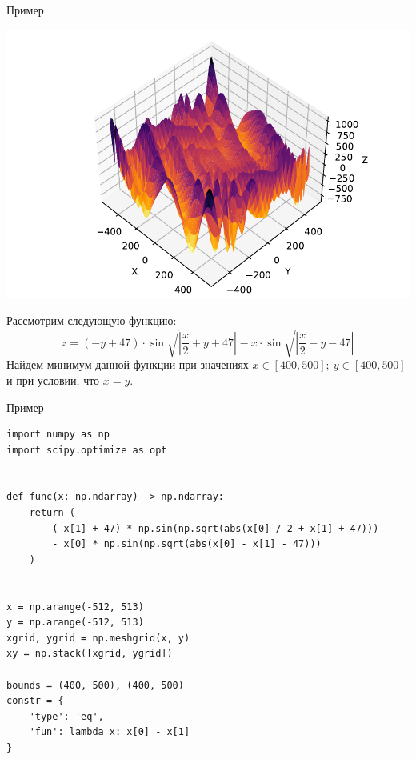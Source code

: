\documentclass[aspectratio=169, mathserif]{beamer}%
\begin{document}
\begin{frame}[fragile, label=c]{Пример}
\scriptsize
\begin{minipage}{.52\textwidth}
\includegraphics[width=.9\linewidth]{./pics/eggholder}
\end{minipage}
\begin{minipage}{.47\textwidth}
Рассмотрим следующую функцию:
\vfill
\begin{equation*}
z = \left(-y + 47\right) \cdot \sin \sqrt{\left|\dfrac{x}{2} + y + 47\right|} - x \cdot \sin \sqrt{\left|\dfrac{x}{2} - y - 47\right|}
\end{equation*}
\vfill
Найдем минимум данной функции при значениях $x \in \left[400, 500\right];\ y \in \left[400, 500\right]$ и при условии, что $x = y$.
\end{minipage}
\vfill
\end{frame}


\begin{frame}[fragile, label=c]{Пример}
\scriptsize
\begin{verbatim}
import numpy as np
import scipy.optimize as opt


def func(x: np.ndarray) -> np.ndarray:
    return (
        (-x[1] + 47) * np.sin(np.sqrt(abs(x[0] / 2 + x[1] + 47)))
        - x[0] * np.sin(np.sqrt(abs(x[0] - x[1] - 47)))
    )


x = np.arange(-512, 513)
y = np.arange(-512, 513)
xgrid, ygrid = np.meshgrid(x, y)
xy = np.stack([xgrid, ygrid])

bounds = (400, 500), (400, 500)
constr = {
    'type': 'eq',
    'fun': lambda x: x[0] - x[1]
}
\end{verbatim}
\vfill
\end{frame}
\end{document}
